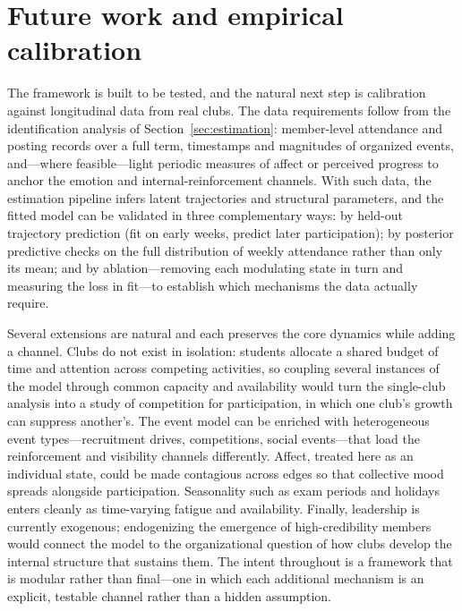 \documentclass[11pt]{article}
\begin{document}
\section{Future work and empirical calibration}\label{sec:future}
The framework is built to be tested, and the natural next step is calibration against longitudinal data from real clubs. The data requirements follow from the identification analysis of Section~\ref{sec:estimation}: member-level attendance and posting records over a full term, timestamps and magnitudes of organized events, and---where feasible---light periodic measures of affect or perceived progress to anchor the emotion and internal-reinforcement channels. With such data, the estimation pipeline infers latent trajectories and structural parameters, and the fitted model can be validated in three complementary ways: by held-out trajectory prediction (fit on early weeks, predict later participation); by posterior predictive checks on the full distribution of weekly attendance rather than only its mean; and by ablation---removing each modulating state in turn and measuring the loss in fit---to establish which mechanisms the data actually require.

Several extensions are natural and each preserves the core dynamics while adding a channel. Clubs do not exist in isolation: students allocate a shared budget of time and attention across competing activities, so coupling several instances of the model through common capacity and availability would turn the single-club analysis into a study of competition for participation, in which one club's growth can suppress another's. The event model can be enriched with heterogeneous event types---recruitment drives, competitions, social events---that load the reinforcement and visibility channels differently. Affect, treated here as an individual state, could be made contagious across edges so that collective mood spreads alongside participation. Seasonality such as exam periods and holidays enters cleanly as time-varying fatigue and availability. Finally, leadership is currently exogenous; endogenizing the emergence of high-credibility members would connect the model to the organizational question of how clubs develop the internal structure that sustains them. The intent throughout is a framework that is modular rather than final---one in which each additional mechanism is an explicit, testable channel rather than a hidden assumption.

\end{document}

